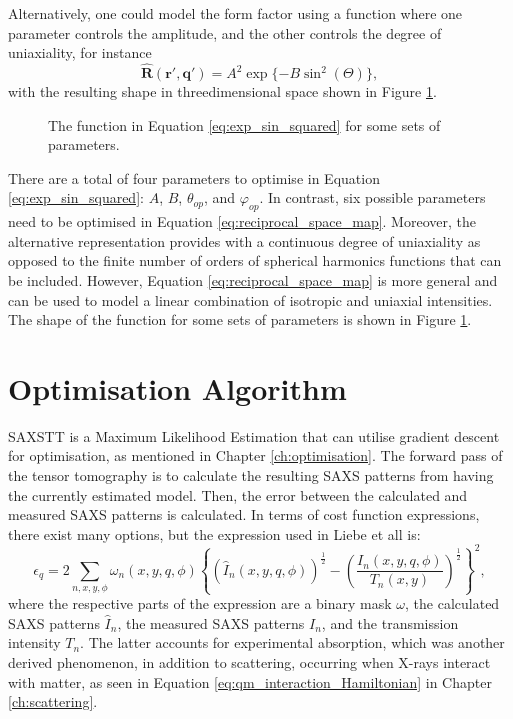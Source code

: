 Alternatively, one could model the form factor using a function where one parameter controls the amplitude, and the other controls the degree of uniaxiality, for instance
\begin{equation}\label{eq:exp_sin_squared}
    \bm{\widehat{R}}(\bm{r'}, \bm{q'}) = A^{2} \exp\{-B \sin^{2}\left( \Theta\right) \},
\end{equation}
with the resulting shape in threedimensional space shown in Figure \ref{fig:exp_sin_squared}.

\begin{figure}
    \centering
    
    \caption{The function in Equation \eqref{eq:exp_sin_squared} for some sets of parameters.}
    \label{fig:exp_sin_squared}
\end{figure}

There are a total of four parameters to optimise in Equation \eqref{eq:exp_sin_squared}: $A$, $B$, $\theta_{op}$, and $\varphi_{op}$.
In contrast, six possible parameters need to be optimised in Equation \eqref{eq:reciprocal_space_map}.
Moreover, the alternative representation provides with a continuous degree of uniaxiality
as opposed to the finite number of orders of spherical harmonics functions that can be included.
However, Equation \eqref{eq:reciprocal_space_map} is more general and can be used to model a linear combination of isotropic and uniaxial intensities.
The shape of the function for some sets of parameters is shown in Figure \ref{fig:exp_sin_squared}.


\section{Optimisation Algorithm}

SAXSTT is a Maximum Likelihood Estimation that can utilise gradient descent for optimisation, as mentioned in Chapter \ref{ch:optimisation}.
The forward pass of the tensor tomography is to calculate the resulting SAXS patterns from having the currently estimated model.
Then, the error between the calculated and measured SAXS patterns is calculated.
In terms of cost function expressions, there exist many options, but the expression used in Liebe et all \cite{liebi2018small} is:
\begin{equation}
    \epsilon_{q} = 2 \sum_{n, x, y, \phi} \omega_{n}(x,y,q,\phi) \left\{ \left( \widehat{I}_{n}(x,y,q,\phi) \right)^{\frac{1}{2}}  -  \left( \frac{ I_{n}(x,y,q,\phi) }{T_{n}(x,y)} \right)^{\frac{1}{2}} \right\}^{2},
\end{equation}
\noindent
where the respective parts of the expression are a binary mask $\omega$, the calculated SAXS patterns $\widehat{I}_{n}$, the measured SAXS patterns $I_{n}$, and the transmission intensity $T_{n}$.
The latter accounts for experimental absorption, which was another derived phenomenon, in addition to scattering, occurring when X-rays interact with matter,
as seen in Equation \eqref{eq:qm_interaction_Hamiltonian} in Chapter \ref{ch:scattering}.


